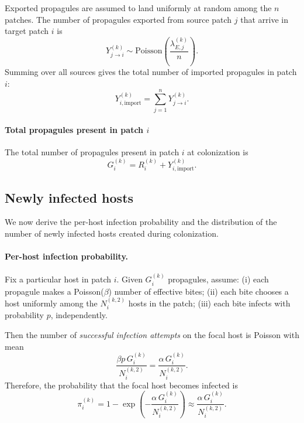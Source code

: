 \documentclass[12pt]{article}
\begin{document}
Exported propagules are assumed to land uniformly at random among the $n$ patches.
The number of propagules exported from source patch $j$ that arrive in target patch $i$ is
\begin{equation}
Y_{j\to i}^{(k)} \sim \mathrm{Poisson}\!\left(\frac{\lambda_{E,j}^{(k)}}{n}\right).
\label{eq:Yjtoi}
\end{equation}
Summing over all sources gives the total number of imported propagules in patch $i$:
\begin{equation}
Y_{i,\mathrm{import}}^{(k)} = \sum_{j=1}^n Y_{j\to i}^{(k)}.
\label{eq:Yimport}
\end{equation}

\paragraph{Total propagules present in patch $i$}
The total number of propagules present in patch $i$ at colonization is
\begin{equation}
G_i^{(k)} = R_i^{(k)} + Y_{i,\mathrm{import}}^{(k)}.
\label{eq:Gi}
\end{equation}

\subsection{Newly infected hosts}
We now derive the per-host infection probability and the distribution of the number of newly infected hosts created during colonization.

\paragraph{Per-host infection probability.}
Fix a particular host in patch $i$. Given $G_i^{(k)}$ propagules, assume:
(i) each propagule makes a Poisson($\beta$) number of effective bites;
(ii) each bite chooses a host uniformly among the $N_i^{(k,2)}$ hosts in the patch;
(iii) each bite infects with probability $p$, independently.

Then the number of \emph{successful infection attempts} on the focal host is Poisson with mean
\[
\frac{\beta p\,G_i^{(k)}}{N_i^{(k,2)}} = \frac{\alpha\,G_i^{(k)}}{N_i^{(k,2)}}.
\]
Therefore, the probability that the focal host becomes infected is
\begin{equation}
\pi_i^{(k)} = 1-\exp\!\left(-\frac{\alpha\,G_i^{(k)}}{N_i^{(k,2)}}\right)\approx\frac{\alpha\,G_i^{(k)}}{N_i^{(k,2)}}.
\label{eq:pi}
\end{equation}
\end{document}
